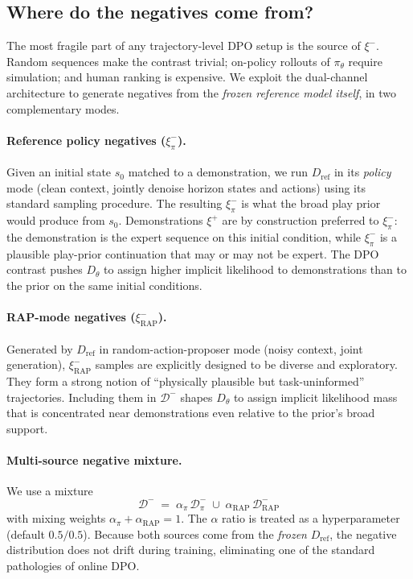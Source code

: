 \documentclass[11pt]{article}
\newcommand{\Dtheta}{D_\theta}
\newcommand{\Dref}{D_{\mathrm{ref}}}
\newcommand{\Dneg}{\mathcal{D}^{-}}
\begin{document}
\subsection{Where do the negatives come from?}
\label{sec:wm-negatives}

The most fragile part of any trajectory-level DPO setup is the source of $\xi^-$. Random sequences make the contrast trivial; on-policy rollouts of $\pi_\theta$ require simulation; and human ranking is expensive. We exploit the dual-channel architecture to generate negatives from the \emph{frozen reference model itself}, in two complementary modes.

\paragraph{Reference policy negatives ($\xi^-_\pi$).}
Given an initial state $s_0$ matched to a demonstration, we run $\Dref$ in its \emph{policy} mode (clean context, jointly denoise horizon states and actions) using its standard sampling procedure. The resulting $\xi^-_\pi$ is what the broad play prior would produce from $s_0$. Demonstrations $\xi^+$ are by construction preferred to $\xi^-_\pi$: the demonstration is the expert sequence on this initial condition, while $\xi^-_\pi$ is a plausible play-prior continuation that may or may not be expert. The DPO contrast pushes $\Dtheta$ to assign higher implicit likelihood to demonstrations than to the prior on the same initial conditions.

\paragraph{RAP-mode negatives ($\xi^-_{\mathrm{RAP}}$).}
Generated by $\Dref$ in random-action-proposer mode (noisy context, joint generation), $\xi^-_{\mathrm{RAP}}$ samples are explicitly designed to be diverse and exploratory. They form a strong notion of ``physically plausible but task-uninformed'' trajectories. Including them in $\Dneg$ shapes $\Dtheta$ to assign implicit likelihood mass that is concentrated near demonstrations even relative to the prior's broad support.

\paragraph{Multi-source negative mixture.}
We use a mixture
\begin{equation}
    \Dneg \;=\; \alpha_\pi\,\Dneg_\pi \;\cup\; \alpha_{\mathrm{RAP}}\,\Dneg_{\mathrm{RAP}}
\end{equation}
with mixing weights $\alpha_\pi + \alpha_{\mathrm{RAP}} = 1$. The $\alpha$ ratio is treated as a hyperparameter (default $0.5/0.5$). Because both sources come from the \emph{frozen} $\Dref$, the negative distribution does not drift during training, eliminating one of the standard pathologies of online DPO.
\end{document}
